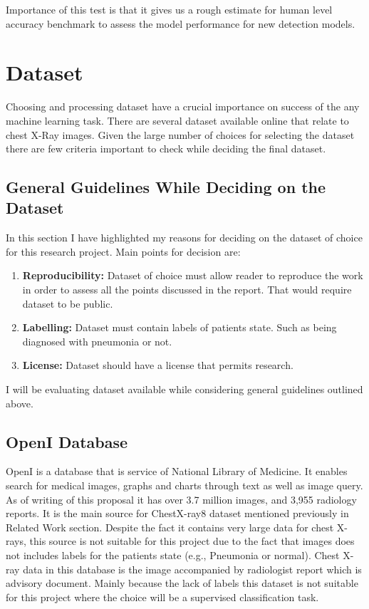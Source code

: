 \documentclass[12pt, twoside, a4paper]{article}
\begin{document}
Importance of this test is that it gives us a rough estimate for human level accuracy benchmark to assess the model performance for new detection models.


\clearpage
\section{Dataset}
Choosing and processing dataset have a crucial importance on success of the any machine learning task. There are several dataset available online that relate to chest X-Ray images. Given the large number of choices for selecting the dataset there are few criteria important to check while deciding the final dataset.

\subsection{General Guidelines While Deciding on the Dataset}
In this section I have highlighted my reasons for deciding on the dataset of choice for this research project. Main points for decision are:
\begin{enumerate}
    \item \textbf{Reproducibility: }Dataset of choice must allow reader to reproduce the work in order to assess all the points discussed in the report. That would require dataset to be public.
    \item \textbf{Labelling: }Dataset must contain labels of patients state. Such as being diagnosed with pneumonia or not.
    \item \textbf{License: }Dataset should have a license that permits research.
\end{enumerate}
I will be evaluating dataset available while considering general guidelines outlined above.

\subsection{OpenI Database}

OpenI\cite{openi} is a database that is service of National Library of Medicine. It enables search for medical images, graphs and charts through text as well as image query. As of writing of this proposal it has over 3.7 million images, and 3,955 radiology reports. It is the main source for ChestX-ray8 dataset mentioned previously in Related Work section. Despite the fact it contains very large data for chest X-rays, this source is not suitable for this project due to the fact that images does not includes labels for the patients state (e.g., Pneumonia or normal). Chest X-ray data in this database is the image accompanied by radiologist report which is advisory document. Mainly because the lack of labels this dataset is not suitable for this project where the choice will be a supervised classification task.
\end{document}
